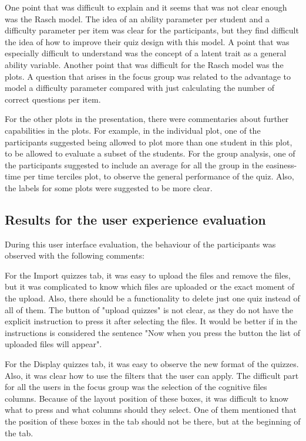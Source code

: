 One point that was difficult to explain and it seems that was not clear enough was the Rasch model. The idea of an ability parameter per student and a difficulty parameter per item was clear for the participants, but they find difficult the idea of how to improve their quiz design with this model. A point that was especially difficult to understand was the concept of a latent trait as a general ability variable. Another point that was difficult for the Rasch model was the plots. 
A question that arises in the focus group was related to the advantage to model a difficulty parameter compared with just calculating the number of correct questions per item. 

For the other plots in the presentation, there were commentaries about further capabilities in the plots. For example, in the individual plot, one of the participants suggested being allowed to plot more than one student in this plot, to be allowed to evaluate a subset of the students. For the group analysis, one of the participants suggested to include an average for all the group in the easiness-time per time terciles plot, to observe the general performance of the quiz. Also, the labels for some plots were suggested to be more clear.

\subsection{Results for the user experience evaluation}

During this user interface evaluation, the behaviour of the participants was observed with the following comments:

For the Import quizzes tab, it was easy to upload the files and remove the files, but it was complicated to know which files are uploaded or the exact moment of the upload. Also, there should be a functionality to delete just one quiz instead of all of them. The button of "upload quizzes" is not clear, as they do not have the explicit instruction to press it after selecting the files. It would be better if in the instructions is considered the sentence "Now when you press the button the list of uploaded files will appear".

For the Display quizzes tab, it was easy to observe the new format of the quizzes. Also, it was clear how to use the filters that the user can apply. The difficult part for all the users in the focus group was the selection of the cognitive files columns. Because of the layout position of these boxes, it was difficult to know what to press and what columns should they select. One of them mentioned that the position of these boxes in the tab should not be there, but at the beginning of the tab.

